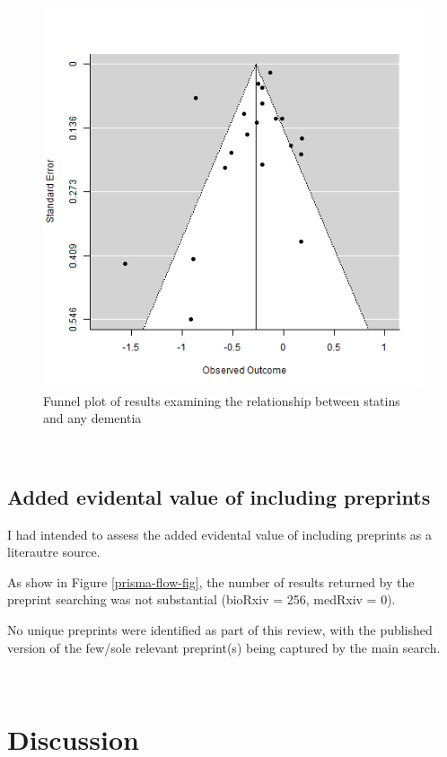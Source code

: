 \documentclass[a4paper, twoside]{templates/ociamthesis}
\begin{document}
\begin{figure}[H]
\includegraphics[width=1\linewidth]{figures/sys-rev/funnel_statins_any} \caption[Funnel plot of results examining the relationship between statins and any dementia]{Funnel plot of results examining the relationship between statins and any dementia}\label{fig:funnelStatinsAny}
\end{figure}

~

\hypertarget{sys-rev-including-preprints}{%
\subsection{Added evidental value of including preprints}\label{sys-rev-including-preprints}}

I had intended to assess the added evidental value of including preprints as a literautre source.

As show in Figure \ref{prisma-flow-fig}, the number of results returned by the preprint searching was not substantial (bioRxiv = 256, medRxiv = 0).

No unique preprints were identified as part of this review, with the published version of the few/sole relevant preprint(s) being captured by the main search.

~

\hypertarget{discussion-1}{%
\section{Discussion}\label{discussion-1}}
\end{document}
